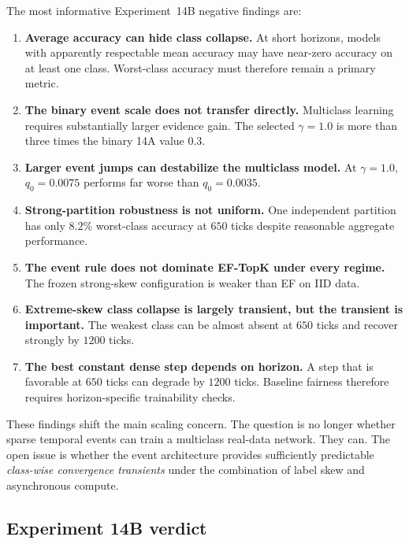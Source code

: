 The most informative Experiment~14B negative findings are:
\begin{enumerate}
    \item \textbf{Average accuracy can hide class collapse.} At short horizons, models with apparently respectable mean accuracy may have near-zero accuracy on at least one class. Worst-class accuracy must therefore remain a primary metric.
    \item \textbf{The binary event scale does not transfer directly.} Multiclass learning requires substantially larger evidence gain. The selected $\gamma=1.0$ is more than three times the binary 14A value $0.3$.
    \item \textbf{Larger event jumps can destabilize the multiclass model.} At $\gamma=1.0$, $q_0=0.0075$ performs far worse than $q_0=0.0035$.
    \item \textbf{Strong-partition robustness is not uniform.} One independent partition has only $8.2\%$ worst-class accuracy at $650$ ticks despite reasonable aggregate performance.
    \item \textbf{The event rule does not dominate EF-TopK under every regime.} The frozen strong-skew configuration is weaker than EF on IID data.
    \item \textbf{Extreme-skew class collapse is largely transient, but the transient is important.} The weakest class can be almost absent at $650$ ticks and recover strongly by $1200$ ticks.
    \item \textbf{The best constant dense step depends on horizon.} A step that is favorable at $650$ ticks can degrade by $1200$ ticks. Baseline fairness therefore requires horizon-specific trainability checks.
\end{enumerate}

These findings shift the main scaling concern. The question is no longer whether sparse temporal events can train a multiclass real-data network. They can. The open issue is whether the event architecture provides sufficiently predictable \emph{class-wise convergence transients} under the combination of label skew and asynchronous compute.

\subsection{Experiment 14B verdict}

